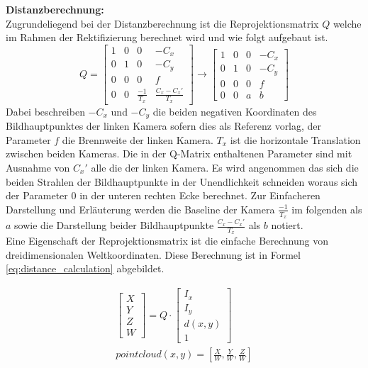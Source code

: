 \noindent
\textbf{Distanzberechnung:}\\
Zugrundeliegend bei der Distanzberechnung ist die Reprojektionsmatrix $Q$ welche im Rahmen der Rektifizierung berechnet wird und wie folgt aufgebaut ist.
\begin{equation}
    Q= 
    \begin{bmatrix}
      1 & 0 & 0 & -C_x\\
      0 & 1 & 0 & -C_y\\
      0 & 0 & 0 & f\\
      0 & 0 & \frac{-1}{T_x} & \frac{C_x - C_x'}{T_x}
    \end{bmatrix}
    \longrightarrow
    \begin{bmatrix}
      1 & 0 & 0 & -C_x\\
      0 & 1 & 0 & -C_y\\
      0 & 0 & 0 & f\\
      0 & 0 & a & b
    \end{bmatrix}
\end{equation}
Dabei beschreiben $-C_x$ und $-C_y$ die beiden negativen Koordinaten des Bildhauptpunktes der linken Kamera sofern dies als Referenz vorlag, der Parameter $f$ die Brennweite der linken Kamera. $T_x$ ist die horizontale Translation zwischen beiden Kameras. Die in der Q-Matrix enthaltenen Parameter sind mit Ausnahme von $C_x'$ alle die der linken Kamera. Es wird angenommen das sich die beiden Strahlen der Bildhauptpunkte in der Unendlichkeit schneiden woraus sich der Parameter $0$ in der unteren rechten Ecke berechnet. Zur Einfacheren Darstellung und Erläuterung werden die Baseline der Kamera $\frac{-1}{T_x}$ im folgenden als $a$ sowie die Darstellung beider Bildhauptpunkte $\frac{C_x - C_x'}{T_x}$ als $b$ notiert.\\

\noindent
Eine Eigenschaft der Reprojektionsmatrix ist die einfache Berechnung von dreidimensionalen Weltkoordinaten. Diese Berechnung ist in Formel \ref{eq:distance_calculation} abgebildet.

\begin{equation}\label{eq:distance_calculation}
    \begin{aligned}
        \begin{bmatrix}
            X\\ Y \\ Z\\ W
        \end{bmatrix}
        = Q \cdot 
        \begin{bmatrix}
            I_x\\ I_y \\ d(x,y)\\ 1
        \end{bmatrix}\\
        pointcloud(x,y) = [\frac{X}{W}, \frac{Y}{W}, \frac{Z}{W} ]
    \end{aligned}
\end{equation}

